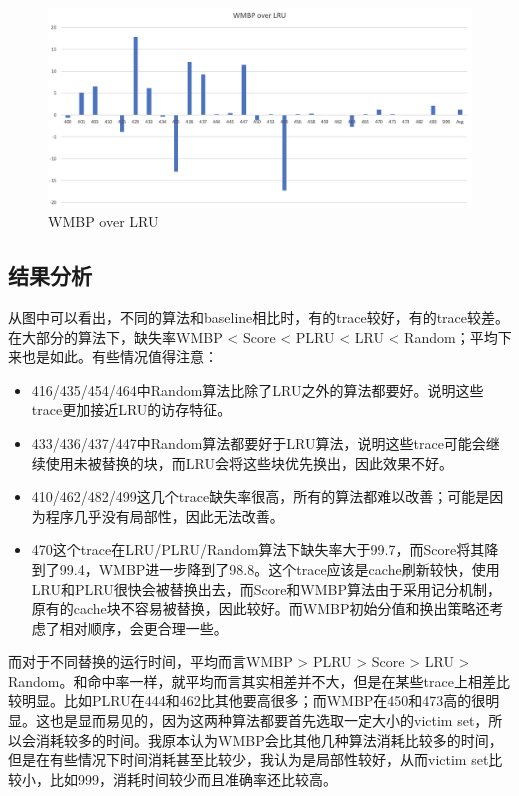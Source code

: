 \documentclass[utf8]{article}
\begin{document}
\begin{figure}[H]
	\centering
    \includegraphics[scale=0.5]{./photos/lru.png}
    \caption{WMBP over LRU}
	\label{Fig3}
\end{figure}

\subsection*{结果分析}
从图中可以看出，不同的算法和baseline相比时，有的trace较好，有的trace较差。在大部分的算法下，缺失率WMBP < Score < PLRU < LRU < Random；平均下来也是如此。有些情况值得注意：
\begin{itemize}
    \item 416/435/454/464中Random算法比除了LRU之外的算法都要好。说明这些trace更加接近LRU的访存特征。
    \item 433/436/437/447中Random算法都要好于LRU算法，说明这些trace可能会继续使用未被替换的块，而LRU会将这些块优先换出，因此效果不好。
    \item 410/462/482/499这几个trace缺失率很高，所有的算法都难以改善；可能是因为程序几乎没有局部性，因此无法改善。
    \item 470这个trace在LRU/PLRU/Random算法下缺失率大于99.7，而Score将其降到了99.4，WMBP进一步降到了98.8。这个trace应该是cache刷新较快，使用LRU和PLRU很快会被替换出去，而Score和WMBP算法由于采用记分机制，原有的cache块不容易被替换，因此较好。而WMBP初始分值和换出策略还考虑了相对顺序，会更合理一些。
\end{itemize}

而对于不同替换的运行时间，平均而言WMBP > PLRU > Score > LRU > Random。和命中率一样，就平均而言其实相差并不大，但是在某些trace上相差比较明显。比如PLRU在444和462比其他要高很多；而WMBP在450和473高的很明显。这也是显而易见的，因为这两种算法都要首先选取一定大小的victim set，所以会消耗较多的时间。我原本认为WMBP会比其他几种算法消耗比较多的时间，但是在有些情况下时间消耗甚至比较少，我认为是局部性较好，从而victim set比较小，比如999，消耗时间较少而且准确率还比较高。
\end{document}

